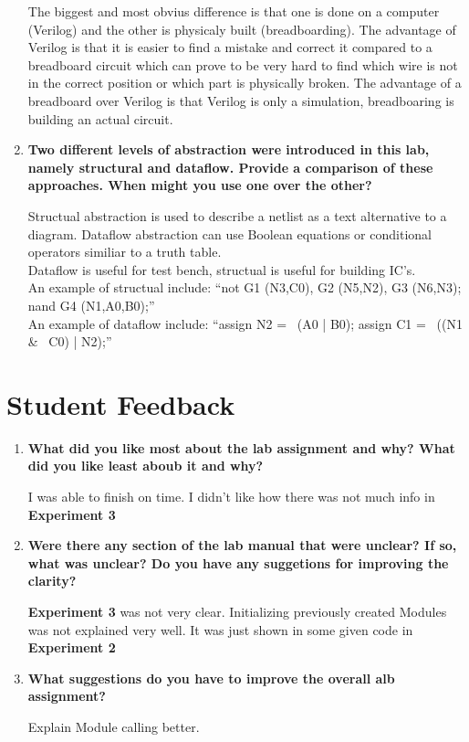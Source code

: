 \documentclass[a4paper,12pt]{article}
\begin{document}
\begin{enumerate}
  The biggest and most obvius difference is that one is done on a computer (Verilog) and the other is physicaly built (breadboarding). The advantage of Verilog is that it is easier to find a mistake and correct it compared to a breadboard circuit which can prove to be very hard to find which wire is not in the correct position or which part is physically broken.
  The advantage of a breadboard over Verilog is that Verilog is only a simulation, breadboaring is building an actual circuit.
  \item \textbf{Two different levels of abstraction were introduced in this lab, namely structural and dataflow. Provide a comparison of these approaches. When might you use one over the other?}
  \vspace{10pt}

  Structual abstraction is used to describe a netlist as a text alternative to a diagram. Dataflow abstraction can use Boolean equations or conditional operators similiar to a truth table. \\
  Dataflow is useful for test bench, structual is useful for building IC's. \\
  An example of structual include: ``not G1 (N3,C0), G2 (N5,N2), G3 (N6,N3);
 nand G4 (N1,A0,B0);'' \\
 An example of dataflow include: ``assign N2 = ~(A0 | B0);
 assign C1 = ~((N1 \& ~C0) | N2);''\cite{Verilog}

\end{enumerate}

\section*{Student Feedback}

\begin{enumerate}
  \item \textbf{What did you like most about the lab assignment and why? What did you like least aboub it and why?}
  \vspace{10pt}

  I was able to finish on time. I didn't like how there was not much info in \textbf{Experiment 3}

  \item \textbf{Were there any section of the lab manual that were unclear? If so, what was unclear? Do you have any suggetions for improving the clarity?}
  \vspace{10pt}

  \textbf{Experiment 3} was not very clear. Initializing previously created Modules was not explained very well. It was just shown in some given code in \textbf{Experiment 2}

  \item \textbf{What suggestions do you have to improve the overall alb assignment?}
  \vspace{10pt}

  Explain Module calling better.
\end{enumerate}
\end{document}
